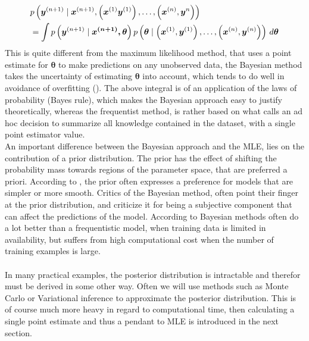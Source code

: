 \begin{equation} \label{eq:post_pred_distribution}
    \begin{split}
        &p\left(\boldsymbol{y}^{(n+1)} \mid \boldsymbol{x}^{(n+1)}, \left (\boldsymbol{x}^{(1)}\boldsymbol{y}^{(1)}\right), \ldots, \left (\boldsymbol{x}^{(n)}, \boldsymbol{y}^{n}\right)\right)\\
        &=\int p\left(\boldsymbol{y}^{(n+1)} \mid \boldsymbol{\boldsymbol{x}^{(n+1)}, \theta}\right) p \left (\boldsymbol{\theta} \mid \left (\boldsymbol{x}^{(1)}, \boldsymbol{y}^{(1)}\right), \ldots, \left (\boldsymbol{x}^{(n)}, \boldsymbol{y}^{(n)}\right)\right) \, d \boldsymbol{\theta}
    \end{split}
\end{equation}
This is quite different from the maximum likelihood method, that uses a point estimate for $\boldsymbol{\theta}$ to make predictions on any unobserved data, the Bayesian method takes the uncertainty of estimating $\boldsymbol{\theta}$ into account, which tends to do well in avoidance of overfitting (\cite{Goodfellow-et-al-2016}). The above integral is of an application of the laws of probability (Bayes rule), which makes the Bayesian approach easy to justify theoretically, whereas the frequentist method, is rather based on what \cite{Goodfellow-et-al-2016} calls an ad hoc decision to summarize all knowledge contained in the dataset, with a single point estimator value. \\
An important difference between the Bayesian approach and the MLE, lies on the contribution of a prior distribution. The prior has the effect of shifting the probability mass towards regions of the parameter space, that are preferred a priori. According to \cite{Goodfellow-et-al-2016}, the prior often expresses a preference for models that are simpler or more smooth. Critics of the Bayesian method, often point their finger at the prior distribution, and criticize it for being a subjective component that can affect the predictions of the model. According to \cite{neal2012bayesian} Bayesian methods often do a lot better than a frequentistic model, when training data is limited in availability, but suffers from high computational cost when the number of training examples is large. \\
\\
In many practical examples, the posterior distribution is intractable and therefor must be derived in some other way. Often we will use methods such as Monte Carlo or Variational inference to approximate the posterior distribution. This is of course much more heavy in regard to computational time, then calculating a single point estimate and thus a pendant to MLE is introduced in the next section.



